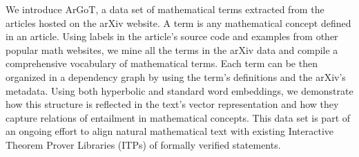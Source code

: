We introduce ArGoT, a data set of mathematical terms extracted from 
the articles hosted on the arXiv website. 
A term is any mathematical concept defined in an article.
Using labels in the article's source code and examples from other
popular math websites, we mine all the terms in the
arXiv data and compile a comprehensive vocabulary of mathematical terms.
Each term can be then organized in a dependency graph by using
the term's definitions and the arXiv's metadata.
Using both hyperbolic and standard word embeddings, we demonstrate how 
this structure is reflected in the text's vector representation and
how they capture relations of entailment in mathematical concepts. This
data set is part of an ongoing effort to align natural mathematical
text with existing Interactive Theorem Prover  Libraries (ITPs) of
formally verified statements.

